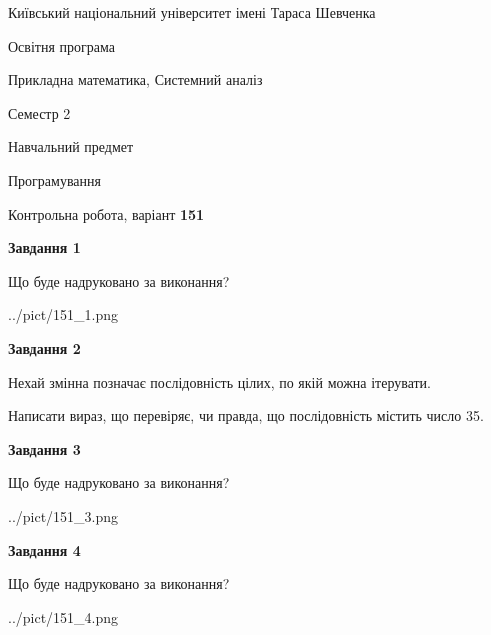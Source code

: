 \documentclass[12pt, ukrainian]{article}
\begin{document}
{{\begin {small}\par
{ \center  Київський національний університет імені Тараса Шевченка \par}
{\parbox {5 cm}{Освітня програма \hfill}{\parbox {8 cm}{Прикладна математика, Системний аналіз \hfill}}\parbox {5 cm}{\hfill Семестр 2}}\par
{\parbox {5 cm} {Навчальний предмет \hfill}\parbox {7 cm}{Програмування \hfill}\parbox {6cm}{\hfill}\par}\vspace{-7pt} \end{small}}{\center Контрольна робота, варіант  \No \textbf
{ 151 }\par}}
{
\begin {large}
{\begin {center}\textbf{Завдання 1}\end {center}}\par
Що буде надруковано за виконання?\par\par
\begin{center}
	{../pict/151_1.png}
\end{center}
\newpage

{\begin {center}\textbf{Завдання 2}\end {center}}\par
Нехай змінна  позначає послідовність цілих, по якій можна ітерувати.

Написати вираз, що перевіряє, чи правда, що послідовність  містить число 35.\par
\newpage

{\begin {center}\textbf{Завдання 3}\end {center}}\par
Що буде надруковано за виконання?
\begin{center}
	{../pict/151_3.png}
\end{center}
\newpage

{\begin {center}\textbf{Завдання 4}\end {center}}\par
Що буде надруковано за виконання?\par
\begin{center}
	{../pict/151_4.png}
\end{center}
\newpage


\end{large}}
\end{document}
